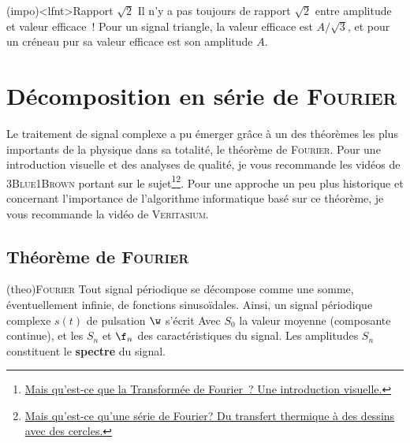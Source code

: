 \documentclass[../../main/main.tex]{subfiles}
\begin{document}
\begin{tcb*}(impo)<lfnt>{Rapport $\sqrt{2}$}
	Il n'y a pas toujours de rapport $\sqrt{2}$ entre amplitude et valeur
	efficace~! Pour un signal triangle, la valeur efficace est $A/\sqrt{3}$, et
	pour un créneau pur sa valeur efficace est son amplitude $A$.
\end{tcb*}

\section{Décomposition en série de \textsc{Fourier}}
Le traitement de signal complexe a pu émerger grâce à un des théorèmes les plus
importants de la physique dans sa totalité, le théorème de \textsc{Fourier}.
Pour une introduction visuelle et des analyses de qualité, je vous recommande
les vidéos de \textsc{3Blue1Brown} portant sur le
sujet\footnote{%
	\href{https://www.youtube.com/watch?v=spUNpyF58BY}%
	{Mais qu'est-ce que la Transformée de Fourier~? Une introduction visuelle.}
}\footnote{%
	\href{https://www.youtube.com/watch?v=r6sGWTCMz2k}%
	{Mais qu'est-ce qu'une série de Fourier? Du transfert thermique à des
		dessins avec des cercles.}}. Pour
une approche un peu plus historique et concernant l'importance de l'algorithme
informatique basé sur ce théorème, je vous recommande la vidéo de
\textsc{Veritasium}.
\vspace{-15pt}
\subsection{Théorème de \textsc{Fourier}}
\begin{tcb*}[breakable](theo){\textsc{Fourier}}
	Tout signal périodique se décompose comme une somme, éventuellement infinie,
	de fonctions sinusoïdales. Ainsi, un signal périodique complexe $s(t)$ de
	pulsation $\w$ s'écrit
	\psw{
		\[
			s(t) = S_0 + \sum_{n=1}^{+\infty} S_n \sin(n\w t + \f_n)
			\Lra
			s(t) = S_0 + \sum_{n=1}^{+\infty} S_n \sin(2\pi nf t + \f_n)
		\]
	}%
	Avec $S_0$ la valeur moyenne (composante continue), et les $S_n$ et $\f_n$ des
	caractéristiques du signal. Les amplitudes $S_n$ constituent le
	\textbf{spectre} du signal.
\end{tcb*}
\end{document}

